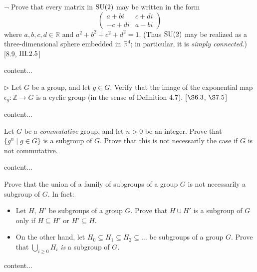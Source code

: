 \begin{exercise}
	$\neg$ Prove that every matrix in $\operatorname{SU}(2)$ may be written in the form
	\[
		\begin{pmatrix}
			a + bi & c + di \\
			-c + di & a - bi
		\end{pmatrix}
	\]
	where $a,b,c,d\in \mathbb{R}$ and $a^2 + b^2 + c^2 + d^2 = 1$. (Thus $\operatorname{SU}(2)$ may be realized as a three-dimensional sphere embedded in $\mathbb{R}^4$; in particular, it is \emph{simply connected}.) [8.9, $\RNo{3}.2.5$]
\end{exercise}
\begin{solution}
	content...
\end{solution}

\begin{exercise}
	$\triangleright$ Let $G$ be a group, and let $g\in G$. Verify that the image of the exponential map $\epsilon_g \colon \mathbb{Z} \to G$ is a cyclic group (in the sense of Definition 4.7). [$\S 6.3$, $\S 7.5$]
\end{exercise}
\begin{solution}
	content...
\end{solution}
\begin{exercise}
	Let $G$ be a \emph{commutative} group, and let $n>0$ be an integer. Prove that $\{g^n\mid g \in G\}$ is a subgroup of $G$. Prove that this is not necessarily the case if $G$ is not commutative.
\end{exercise}
\begin{solution}
	content...
\end{solution}

\begin{exercise}
	Prove that the union of a family of subgroups of a group $G$ is not necessarily a subgroup of $G$. In fact:
	\begin{itemize}
		\item Let $H$, $H'$ be subgroups of a group $G$. Prove that $H\cup H'$ is a subgroup of $G$ only if $H\subseteq H'$ or $H'\subseteq H$.
		\item On the other hand, let $H_0\subseteq H_1\subseteq H_2\subseteq \ldots$ be subgroups of a group $G$. Prove that $\bigcup_{i\geq 0}H_i$ \emph{is} a subgroup of $G$. 
	\end{itemize}
\end{exercise}
\begin{solution}
	content...
\end{solution}

